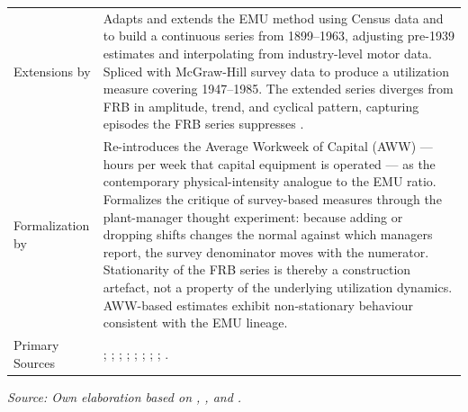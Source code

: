 \documentclass[11pt,a4paper]{article}
\begin{document}
\begin{table}[!h]
\begin{tabular}{p{3.2cm} p{10.5cm}}
		Extensions by \citet{Shaikh1992} &
		Adapts and extends the EMU method using Census data and
		\citet{Christensen1969} to build a continuous series from
		1899--1963, adjusting pre-1939 estimates and interpolating from
		industry-level motor data. Spliced with McGraw-Hill survey data to
		produce a utilization measure covering 1947--1985. The extended
		series diverges from FRB in amplitude, trend, and cyclical
		pattern, capturing episodes the FRB series suppresses
		\citep[Appendix~6.6]{Shaikh2016}. \\[4pt]
		
		Formalization by \citet{Nikiforos2016} &
		Re-introduces the Average Workweek of Capital (AWW) --- hours per
		week that capital equipment is operated --- as the contemporary
		physical-intensity analogue to the EMU ratio. Formalizes the
		critique of survey-based measures through the plant-manager
		thought experiment: because adding or dropping shifts changes the
		normal against which managers report, the survey denominator moves
		with the numerator. Stationarity of the FRB series is thereby a
		construction artefact, not a property of the underlying utilization
		dynamics. AWW-based estimates exhibit non-stationary behaviour
		consistent with the EMU lineage. \\[4pt]
		
		Primary Sources &
		\citet{USfpc1945}; \citet{UScensus1966}; \citet{UScensus1967};
		\citet{UScensus1975}; \citet{USdc1986}; \citet{Christensen1969};
		\citet{Foss1963}; \citet{Shaikh1992,Shaikh2016};
		\citet{Nikiforos2016}. \\
		
		\bottomrule
	\end{tabular}
	\smallskip
	
	\noindent\textit{Source: Own elaboration based on \citet{Foss1963},
		\citet{Shaikh1992,Shaikh2016}, and \citet{Nikiforos2016}.}
\end{table}
\end{document}

